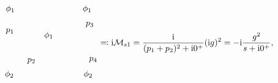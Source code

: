 \begin{equation}
\begin{gathered}
\begin{tikzpicture}[x=0.75pt,y=0.75pt,yscale=-0.75,xscale=0.75]
            \draw (129.71,75.6) node [anchor=south east] [inner sep=0.75pt]    {$\phi _{1}$};
            \draw (127.71,193.88) node [anchor=north east] [inner sep=0.75pt]    {$\phi _{2}$};
            \draw (128,105.86) node [anchor=north east] [inner sep=0.75pt]    {$p_{1}$};
            \draw (152.41,168.5) node [anchor=north west][inner sep=0.75pt]    {$p_{2}$};
            \draw (198.56,131.34) node [anchor=south] [inner sep=0.75pt]    {$\phi _{1}$};
            \draw (273.62,106.42) node [anchor=south west] [inner sep=0.75pt]    {$p_{3}$};
            \draw (280.71,173.1) node [anchor=west] [inner sep=0.75pt]    {$p_{4}$};
            \draw (267.41,75.6) node [anchor=south west] [inner sep=0.75pt]    {$\phi _{1}$};
            \draw (269.41,193.88) node [anchor=north west][inner sep=0.75pt]    {$\phi _{2}$};
            \end{tikzpicture}
    \end{gathered} \eqqcolon \ii \mathcal{M}_{s1} = 
    \frac{\ii}{(p_1 + p_2)^2  + \ii 0^+} (\ii g)^2 = - \ii \frac{g^2}{s + \ii 0^+} ,
\end{equation}